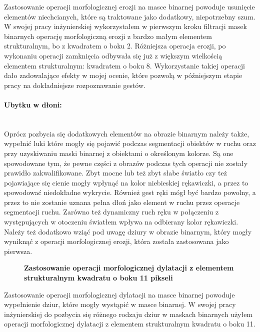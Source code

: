 \documentclass[a4paper,12pt,twoside,openany]{report}
\newcommand{\ImgPath}{.}
\begin{document}
Zastosowanie operacji morfologicznej erozji na masce binarnej powoduje usunięcie elementów niechcianych, które są traktowane jako dodatkowy, niepotrzebny szum. W swojej pracy inżynierskiej wykorzystałem w pierwszym kroku filtracji masek binarnych operację morfologiczną erozji z bardzo małym elementem strukturalnym, bo z kwadratem o boku 2. Różniejsza operacja erozji, po wykonaniu operacji zamknięcia odbywała się już z większym wielkością elementem strukturalnym: kwadratem o boku 8.  Wykorzystanie takiej operacji dało zadowalające efekty w mojej ocenie, które pozwolą w późniejszym etapie pracy na dokładniejsze rozpoznawanie gestów.

\paragraph{Ubytku w dłoni:} \mbox{} \\
Oprócz pozbycia się dodatkowych elementów na obrazie binarnym należy także, wypełnić luki które mogły się pojawić podczas segmentacji obiektów w ruchu oraz przy uzyskiwaniu maski binarnej z obiektami o określonym kolorze. Są one spowodowane tym, że pewne części z obrazów podczas tych operacji nie zostały prawidło zakwalifikowane. Zbyt mocne lub też zbyt słabe światło czy też pojawiające się cienie mogły wpłynąć na kolor niebieskiej rękawiczki, a przez to spowodować niedokładne wykrycie. Również gest ręki mógł być bardzo powolny, a przez to nie zostanie uznana pełna dłoń jako element w ruchu przez operacje segmentacji ruchu. Zarówno też dynamiczny ruch ręku w połączeniu z występujących w otoczeniu światłem wpływa na odbierany kolor rękawiczki. Należy też dodatkowo wziąć pod uwagę dziury w obrazie binarnym, który mogły wyniknąć z operacji morfologicznej erozji, która została zastosowana jako pierwsza. 

\begin{figure}[H]
	\centering
	\caption{  \textbf{Zastosowanie operacji morfologicznej dylatacji z elementem strukturalnym kwadratu o boku 11 pikseli}}
\end{figure}

Zastosowanie operacji morfologicznej dylatacji na masce binarnej powoduje wypełnienie dziur, które mogły wystąpić w masce binarnej. W swojej pracy inżynierskiej do pozbycia się różnego rodzaju dziur w maskach binarnych  użyłem operacji morfologicznej dylatacji z elementem strukturalnym kwadratu o boku 11. 
\end{document}
